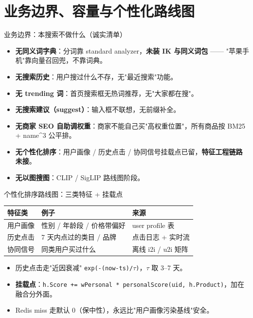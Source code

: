 \documentclass[aspectratio=169,11pt]{beamer}
\begin{document}
\section{业务边界、容量与个性化路线图}

\begin{frame}[shrink]{业务边界：本搜索不做什么（诚实清单）}
\begin{itemize}
  \item \textbf{无同义词字典}：分词靠 standard analyzer，\textbf{未装 IK 与同义词包} —— "苹果手机"靠向量召回兜，不靠词典。
  \item \textbf{无搜索历史}：用户搜过什么不存，无"最近搜索"功能。
  \item \textbf{无 trending 词}：首页搜索框无热词推荐，无"大家都在搜"。
  \item \textbf{无搜索建议（suggest）}：输入框不联想，无前缀补全。
  \item \textbf{无商家 SEO 自助调权重}：商家不能自己买"高权重位置"，所有商品按 BM25 + name\^{}3 公平排。
  \item \textbf{无个性化排序}：用户画像 / 历史点击 / 协同信号挂载点已留，\textbf{特征工程链路未接}。
  \item \textbf{无以图搜图}：CLIP / SigLIP 路线图阶段。
\end{itemize}
\end{frame}

\begin{frame}[shrink]{个性化排序路线图：三类特征 + 挂载点}
\begin{tabular}{@{}lll@{}}
\toprule
特征类      & 例子                          & 来源                  \\
\midrule
用户画像    & 性别 / 年龄段 / 价格带偏好   & user profile 表       \\
历史点击    & 7 天内点过的类目 / 品牌       & 点击日志 + 实时流     \\
协同信号    & 同类用户买过什么             & 离线 i2i / u2i 矩阵   \\
\bottomrule
\end{tabular}
\vspace{2mm}
\begin{itemize}
  \item 历史点击走"近因衰减" \texttt{exp(-(now-ts)/\(\tau\))}，\(\tau\) 取 3--7 天。
  \item \textbf{挂载点}：\texttt{h.Score += wPersonal * personalScore(uid, h.Product)}，加在融合分外面。
  \item Redis miss 走默认 0（保中性），永远比"用户画像污染基线"安全。
\end{itemize}
\end{frame}
\end{document}
